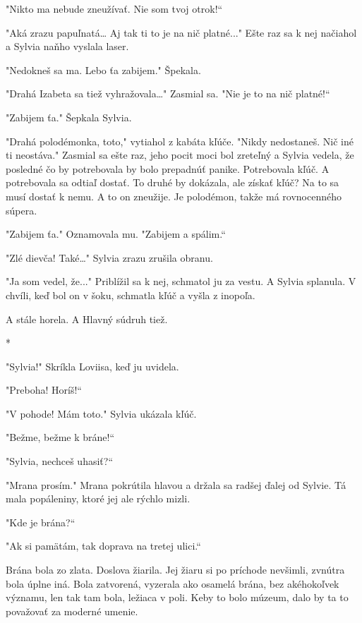 \documentclass{book}
\begin{document}
"$ $Nikto ma nebude zneužívať. Nie som tvoj otrok!“

"$ $Aká zrazu papuľnatá… Aj tak ti to je na nič platné..."$ $ Ešte raz sa k nej načiahol a Sylvia naňho vyslala laser.

"$ $Nedokneš sa ma. Lebo ťa zabijem."$ $ Špekala.

"$ $Drahá Izabeta sa tiež vyhražovala…"$ $ Zasmial sa. "$ $Nie je to na nič platné!“

"$ $Zabijem ťa."$ $ Šepkala Sylvia.

"$ $Drahá polodémonka, toto,"$ $ vytiahol z kabáta kľúče. "$ $Nikdy nedostaneš. Nič iné ti neostáva."$ $ Zasmial sa ešte raz, jeho pocit moci bol zreteľný a Sylvia vedela, že posledné čo by potrebovala by bolo prepadnúť panike. Potrebovala kľúč. A potrebovala sa odtiaľ dostať. To druhé by dokázala, ale získať kľúč? Na to sa musí dostať k nemu. A to on zneužije. Je polodémon, takže má rovnocenného súpera.

"$ $Zabijem ťa."$ $ Oznamovala mu. "$ $Zabijem a spálim.“

"$ $Zlé dievča! Také…"$ $ Sylvia zrazu zrušila obranu.

"$ $Ja som vedel, že..."$ $ Priblížil sa k nej, schmatol ju za vestu. A Sylvia splanula. V chvíli, keď bol on v šoku, schmatla kľúč a vyšla z inopoľa.

A stále horela. A Hlavný súdruh tiež.

\begin{center}
*
\end{center}

"$ $Sylvia!"$ $ Skríkla Loviisa, keď ju uvidela.

"$ $Preboha! Horíš!“

"$ $V pohode! Mám toto."$ $ Sylvia ukázala kľúč.

"$ $Bežme, bežme k bráne!“

"$ $Sylvia, nechceš uhasiť?“

"$ $Mrana prosím."$ $ Mrana pokrútila hlavou a držala sa radšej ďalej od Sylvie. Tá mala popáleniny, ktoré jej ale rýchlo mizli.

"$ $Kde je brána?“

"$ $Ak si pamätám, tak doprava na tretej ulici.“

Brána bola zo zlata. Doslova žiarila. Jej žiaru si po príchode nevšimli, zvnútra bola úplne iná. Bola zatvorená, vyzerala ako osamelá brána, bez akéhokoľvek významu, len tak tam bola, ležiaca v poli. Keby to bolo múzeum, dalo by ta to považovať za moderné umenie.
\end{document}
